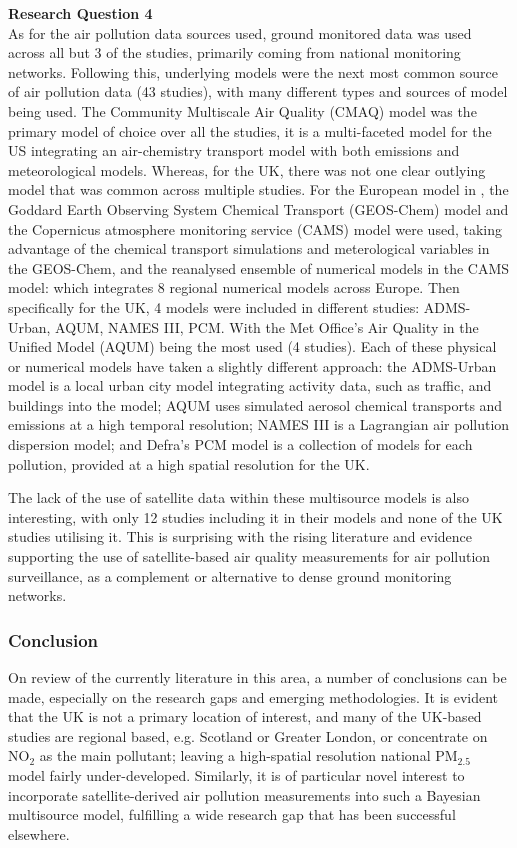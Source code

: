 \textbf{Research Question 4}\\
As for the air pollution data sources used, ground monitored data was used across all but 3 of the studies, primarily coming from national monitoring networks. Following this, underlying models were the next most common source of air pollution data (43 studies), with many different types and sources of model being used. The Community Multiscale Air Quality (CMAQ) model was the primary model of choice over all the studies, it is a multi-faceted model for the US integrating an air-chemistry transport model with both emissions and meteorological models. Whereas, for the UK, there was not one clear outlying model that was common across multiple studies. For the European model in \cite{Beloconi2020BayesianModels}, the Goddard Earth Observing System Chemical Transport (GEOS-Chem) model and the Copernicus atmosphere monitoring service (CAMS) model were used, taking advantage of the chemical transport simulations and meterological variables in the GEOS-Chem, and the reanalysed ensemble of numerical models in the CAMS model: which integrates 8 regional numerical models across Europe. Then specifically for the UK, 4 models were included in different studies: ADMS-Urban, AQUM, NAMES III, PCM. With the Met Office's Air Quality in the Unified Model (AQUM) being the most used (4 studies). Each of these physical or numerical models have taken a slightly different approach: the ADMS-Urban model is a local urban city model integrating activity data, such as traffic, and buildings into the model; AQUM uses simulated aerosol chemical transports and emissions at a high temporal resolution; NAMES III is a Lagrangian air pollution dispersion model; and Defra's PCM model is a collection of models for each pollution, provided at a high spatial resolution for the UK.

The lack of the use of satellite data within these multisource models is also interesting, with only 12 studies including it in their models and none of the UK studies utilising it. This is surprising with the rising literature and evidence supporting the use of satellite-based air quality measurements for air pollution surveillance, as a complement or alternative to dense ground monitoring networks.

\subsubsection{Conclusion}
On review of the currently literature in this area, a number of conclusions can be made, especially on the research gaps and emerging methodologies. It is evident that the UK is not a primary location of interest, and many of the UK-based studies are regional based, e.g. Scotland or Greater London, or concentrate on NO$_{2}$ as the main pollutant; leaving a high-spatial resolution national PM$_{2.5}$ model fairly under-developed. Similarly, it is of particular novel interest to incorporate satellite-derived air pollution measurements into such a Bayesian multisource model, fulfilling a wide research gap that has been successful elsewhere.

